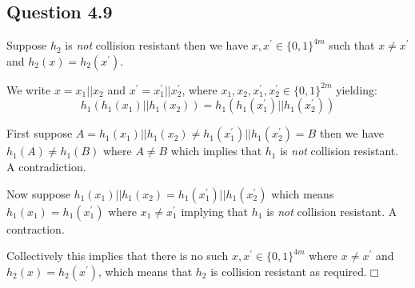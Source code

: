 \documentclass[12pt,article,oneside]{memoir}
\begin{document}
\subsection*{Question 4.9}

Suppose $h_2$ is \emph{not} collision resistant then we have $x,x^\prime \in \{0,1\}^{4m} $ such that $x \neq x^\prime$ and $h_2(x)=h_2(x^\prime)$.

We write $x=x_1 || x_2$ and  $x^\prime = x_1 ^\prime || x_2^\prime$, where $x_1,x_2,x_1^\prime,x_2^\prime \in \{0,1\}^{2m}$ yielding:
$$h_1 (h_1(x_1) || h_1(x_2))=h_1 (h_1(x_1^\prime) || h_1(x_2^\prime)) $$

First suppose $A=h_1(x_1) || h_1(x_2) \neq h_1(x_1^\prime) || h_1(x_2^\prime)=B$ then we have $h_1(A) \neq h_1(B)$ where $A \neq B$ which implies that $h_1$ is \emph{not} collision resistant. A contradiction.

Now suppose $h_1(x_1) || h_1(x_2) = h_1(x_1^\prime) || h_1(x_2^\prime)$ which means $h_1(x_1) = h_1(x_1^\prime) $ where $x_1 \neq x_1^\prime$ implying that $h_1$ is \emph{not} collision resistant. A contraction.

Collectively this implies that there is no such $x,x^\prime \in \{0,1\}^{4m} $ where $x \neq x^\prime$ and $h_2(x)=h_2(x^\prime)$, which means that $h_2$ is collision resistant as required.$\Box$
\end{document}
